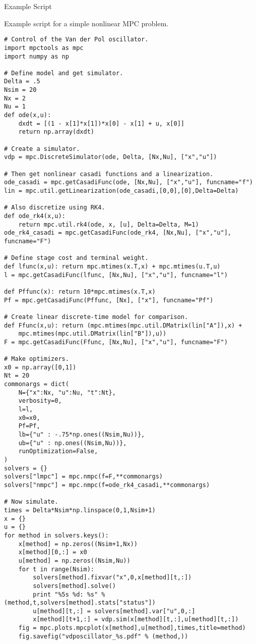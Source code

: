 \documentclass[xcolor=dvipsnames]{beamer}
\begin{document}
\begin{frame}{Example Script}

Example script for a simple nonlinear MPC problem.

\begin{lstlisting}[style=python,basicstyle=\ttfamily\fontsize{6pt}{8}\selectfont]
# Control of the Van der Pol oscillator.
import mpctools as mpc
import numpy as np

# Define model and get simulator.
Delta = .5
Nsim = 20
Nx = 2
Nu = 1
def ode(x,u):
    dxdt = [(1 - x[1]*x[1])*x[0] - x[1] + u, x[0]]
    return np.array(dxdt)

# Create a simulator.
vdp = mpc.DiscreteSimulator(ode, Delta, [Nx,Nu], ["x","u"])

# Then get nonlinear casadi functions and a linearization.
ode_casadi = mpc.getCasadiFunc(ode, [Nx,Nu], ["x","u"], funcname="f")
lin = mpc.util.getLinearization(ode_casadi,[0,0],[0],Delta=Delta)

# Also discretize using RK4.
def ode_rk4(x,u):
    return mpc.util.rk4(ode, x, [u], Delta=Delta, M=1)
ode_rk4_casadi = mpc.getCasadiFunc(ode_rk4, [Nx,Nu], ["x","u"], funcname="F")

# Define stage cost and terminal weight.
def lfunc(x,u): return mpc.mtimes(x.T,x) + mpc.mtimes(u.T,u)
l = mpc.getCasadiFunc(lfunc, [Nx,Nu], ["x","u"], funcname="l")

def Pffunc(x): return 10*mpc.mtimes(x.T,x)
Pf = mpc.getCasadiFunc(Pffunc, [Nx], ["x"], funcname="Pf")

# Create linear discrete-time model for comparison.
def Ffunc(x,u): return (mpc.mtimes(mpc.util.DMatrix(lin["A"]),x) +
    mpc.mtimes(mpc.util.DMatrix(lin["B"]),u))
F = mpc.getCasadiFunc(Ffunc, [Nx,Nu], ["x","u"], funcname="F")

# Make optimizers.
x0 = np.array([0,1])
Nt = 20
commonargs = dict(
    N={"x":Nx, "u":Nu, "t":Nt},
    verbosity=0,
    l=l,
    x0=x0,
    Pf=Pf,
    lb={"u" : -.75*np.ones((Nsim,Nu))},
    ub={"u" : np.ones((Nsim,Nu))},
    runOptimization=False,
)
solvers = {}
solvers["lmpc"] = mpc.nmpc(f=F,**commonargs)
solvers["nmpc"] = mpc.nmpc(f=ode_rk4_casadi,**commonargs)

# Now simulate.
times = Delta*Nsim*np.linspace(0,1,Nsim+1)
x = {}
u = {}
for method in solvers.keys():
    x[method] = np.zeros((Nsim+1,Nx))
    x[method][0,:] = x0
    u[method] = np.zeros((Nsim,Nu))
    for t in range(Nsim):
        solvers[method].fixvar("x",0,x[method][t,:])
        solvers[method].solve()
        print "%5s %d: %s" % (method,t,solvers[method].stats["status"])
        u[method][t,:] = solvers[method].var["u",0,:]
        x[method][t+1,:] = vdp.sim(x[method][t,:],u[method][t,:])
    fig = mpc.plots.mpcplot(x[method],u[method],times,title=method)
    fig.savefig("vdposcillator_%s.pdf" % (method,))
\end{lstlisting}

\end{frame}
\end{document}
